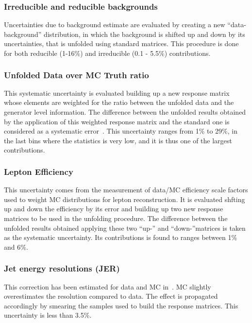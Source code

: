 \subsubsection{Irreducible and reducible backgrounds}
Uncertainties due to background estimate are evaluated by creating a new ``data-background'' distribution, in which the background is shifted up and down by
its uncertainties, that is unfolded using standard matrices. This procedure is done for both reducible (1-16\%) and irreducible (0.1 - 5.5\%) contributions. 

\subsubsection{Unfolded Data over MC Truth ratio}
This systematic uncertainty is evaluated building up a new response matrix whose elements are weighted for the ratio between the unfolded data and the generator level 
information. The difference between the unfolded results obtained by the application of this weighted response matrix and the standard one is considered as a 
systematic error~\cite{CMS_AN_13-165}. This uncertainty ranges from 1\% to 29\%, in the last bins where the statistics is very low, and it is thus one
of the largest contributions.

\subsubsection{Lepton Efficiency}
This uncertainty comes from the measurement of data/MC efficiency scale factors used to weight MC distributions for lepton reconstruction. It is evaluated shfting up and down the efficiency by its error and building up two new response matrices to be used in the unfolding procedure. The difference between the unfolded results obtained applying these two ``up-'' and ``down-''matrices is taken as the systematic uncertainty. Its contributions is found to ranges between 1\% and 6\%.


\subsubsection{Jet energy resolutions (JER)}
This correction has been estimated for data and MC in~\cite{JECandJER}. MC slightly overestimates the resolution compared to data. The effect is propagated accordingly by smearing the samples used to build the response matrices. This uncertainty is less than 3.5\%.%

